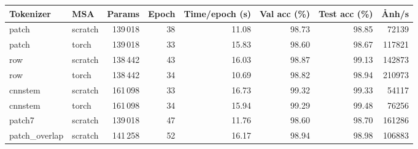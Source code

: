 \begin{tabular}{llrrrrrr}
\toprule
Tokenizer & MSA & Params & Epoch & Time/epoch (s) & Val acc (\%) & Test acc (\%) & Ảnh/s \\
\midrule
patch & scratch & 139\,018 & 38 & 11.08 & 98.73 & 98.85 & 72139 \\
patch & torch & 139\,018 & 33 & 15.83 & 98.60 & 98.67 & 117821 \\
\addlinespace
row & scratch & 138\,442 & 43 & 16.03 & 98.87 & 99.13 & 142873 \\
row & torch & 138\,442 & 34 & 10.69 & 98.82 & 98.94 & 210973 \\
\addlinespace
cnnstem & scratch & 161\,098 & 33 & 16.73 & 99.32 & 99.33 & 54117 \\
cnnstem & torch & 161\,098 & 34 & 15.94 & 99.29 & 99.48 & 76256 \\
\addlinespace
patch7 & scratch & 139\,018 & 47 & 11.76 & 98.60 & 98.70 & 161286 \\
\addlinespace
patch\_overlap & scratch & 141\,258 & 52 & 16.17 & 98.94 & 98.98 & 106883 \\
\bottomrule
\end{tabular}
